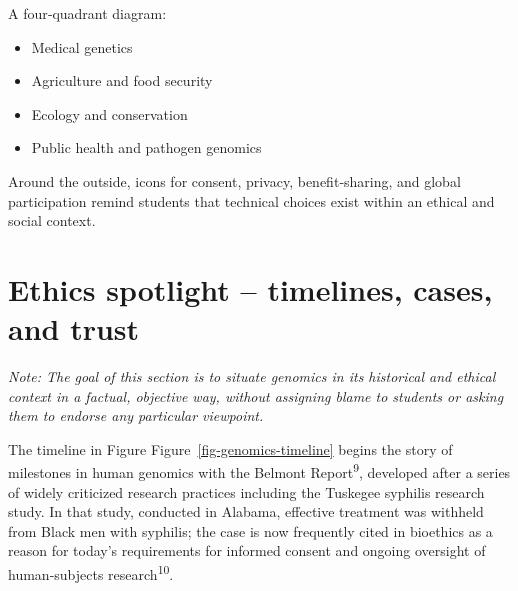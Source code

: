 \documentclass[
  letterpaper,
  DIV=11,
  numbers=noendperiod]{scrreprt}
\providecommand{\tightlist}{%
  \setlength{\itemsep}{0pt}\setlength{\parskip}{0pt}}
\begin{document}
\begin{tcolorbox}[enhanced jigsaw, toptitle=1mm, arc=.35mm, toprule=.15mm, colframe=quarto-callout-note-color-frame, opacitybacktitle=0.6, breakable, left=2mm, titlerule=0mm, bottomtitle=1mm, rightrule=.15mm, title=\textcolor{quarto-callout-note-color}{\faInfo}\hspace{0.5em}{Figure 1.4 -- Applications and equity}, opacityback=0, colbacktitle=quarto-callout-note-color!10!white, leftrule=.75mm, coltitle=black, bottomrule=.15mm, colback=white]

A four‑quadrant diagram:

\begin{itemize}
\tightlist
\item
  Medical genetics\\
\item
  Agriculture and food security\\
\item
  Ecology and conservation\\
\item
  Public health and pathogen genomics
\end{itemize}

Around the outside, icons for consent, privacy, benefit‑sharing, and
global participation remind students that technical choices exist within
an ethical and social context.

\end{tcolorbox}

\section{Ethics spotlight -- timelines, cases, and
trust}\label{ethics-spotlight-timelines-cases-and-trust}

\emph{Note: The goal of this section is to situate genomics in its
historical and ethical context in a factual, objective way, without
assigning blame to students or asking them to endorse any particular
viewpoint.}

The timeline in Figure Figure~\ref{fig-genomics-timeline} begins the
story of milestones in human genomics with the Belmont
Report\textsuperscript{9}, developed after a series of widely criticized
research practices including the Tuskegee syphilis research study. In
that study, conducted in Alabama, effective treatment was withheld from
Black men with syphilis; the case is now frequently cited in bioethics
as a reason for today's requirements for informed consent and ongoing
oversight of human‑subjects research\textsuperscript{10}.
\end{document}
